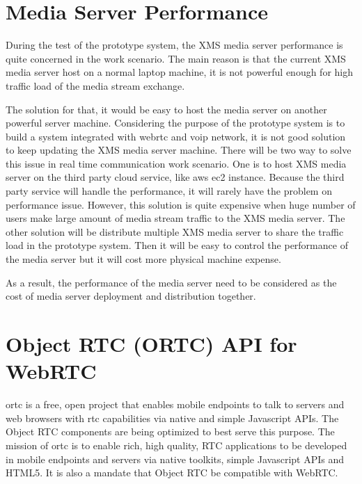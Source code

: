 \section{Media Server Performance}

\par During the test of the prototype system, the XMS media server performance is quite concerned in the work scenario. The main reason is that the current XMS media server host on a normal laptop machine, it is not powerful enough for high traffic load of the media stream exchange.

\par The solution for that, it would be easy to host the media server on another powerful server machine. Considering the purpose of the prototype system is to build a system integrated with \gls{webrtc} and \gls{voip} network, it is not good solution to keep updating the XMS media server machine. There will be two way to solve this issue in real time communication work scenario. One is to host XMS media server on the third party cloud service, like \gls{aws} \gls{ec2} instance. Because the third party service will handle the performance, it will rarely have the problem on performance issue. However, this solution is quite expensive when huge number of users make large amount of media stream traffic to the XMS media server. The other solution will be distribute multiple XMS media server to share the traffic load in the prototype system. Then it will be easy to control the performance of the media server but it will cost more physical machine expense.

\par As a result, the performance of the media server need to be considered as the cost of media server deployment and distribution together.

\section{Object RTC (ORTC) API for WebRTC}

\par \gls{ortc} is a free, open project that enables mobile endpoints to talk to servers and web browsers with \gls{rtc} capabilities via native and simple Javascript APIs. The Object RTC components are being optimized to best serve this purpose.\cite{website:ortc} The mission of \gls{ortc} is to enable rich, high quality, RTC applications to be developed in mobile endpoints and servers via native toolkits, simple Javascript APIs and HTML5. It is also a mandate that Object RTC be compatible with WebRTC.

